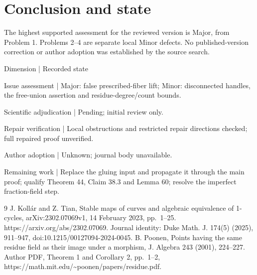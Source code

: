 \documentclass[10pt]{article}
\begin{document}
\section*{Conclusion and state}
The highest supported assessment for the reviewed version is Major, from Problem 1. Problems 2–4 are separate local Minor defects. No published-version correction or author adoption was established by the source search.\par
Dimension | Recorded state\par
Issue assessment | Major: false prescribed-fiber lift; Minor: disconnected handles, the free-union assertion and residue-degree/count bounds.\par
Scientific adjudication | Pending; initial review only.\par
Repair verification | Local obstructions and restricted repair directions checked; full repaired proof unverified.\par
Author adoption | Unknown; journal body unavailable.\par
Remaining work | Replace the gluing input and propagate it through the main proof; qualify Theorem 44, Claim 38.3 and Lemma 60; resolve the imperfect fraction-field step.\par
9 J. Kollár and Z. Tian, Stable maps of curves and algebraic equivalence of 1-cycles, arXiv:2302.07069v1, 14 February 2023, pp. 1–25. https://arxiv.org/abs/2302.07069. Journal identity: Duke Math. J. 174(5) (2025), 911–947, doi:10.1215/00127094-2024-0045. B. Poonen, Points having the same residue field as their image under a morphism, J. Algebra 243 (2001), 224–227. Author PDF, Theorem 1 and Corollary 2, pp. 1–2, https://math.mit.edu/\textasciitilde{}poonen/papers/residue.pdf.\par
\end{document}
